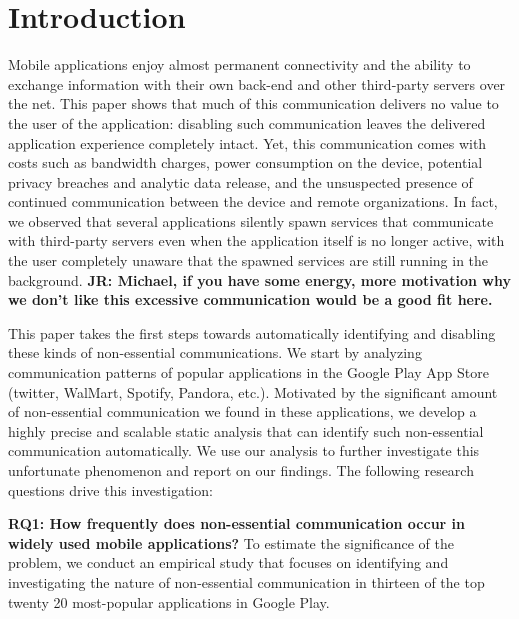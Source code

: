 \section{Introduction}
\label{sec:intro} 

Mobile applications enjoy almost permanent connectivity and the
ability to exchange information with their own back-end and other 
third-party servers over the net. 
This paper shows that much of this communication delivers no value to the
user of the application: disabling such communication leaves the
delivered application experience completely intact.  Yet, this
communication comes with costs such as bandwidth charges, power
consumption on the device, potential privacy breaches and analytic data
release, and the unsuspected presence of continued communication
between the device and remote organizations. In fact, we observed
that several applications silently spawn services that communicate with
third-party servers even when the application itself is no longer
active, with the user completely unaware that the spawned services are
still running in the background.
{\bf JR: Michael, if you have some energy, more motivation why we don't like this excessive communication would be a good fit here.}

This paper takes the first steps towards automatically identifying and
disabling these kinds of non-essential communications. We start by
analyzing communication patterns of
popular applications in the Google Play App Store (twitter, WalMart,
Spotify, Pandora, etc.). Motivated by the significant
amount of non-essential communication we found in these applications, 
we develop a highly precise and scalable static analysis that can identify 
such non-essential communication automatically. We use our analysis to further 
investigate this unfortunate phenomenon and report on our findings. 
The following research questions drive this investigation:

\noindent 
{\bf RQ1: How frequently does non-essential communication occur in
  widely used mobile applications?}  To estimate the significance of
the problem, we conduct an empirical study that focuses on identifying
and investigating the nature of non-essential communication in thirteen of the 
top twenty 20 most-popular applications in Google Play.

